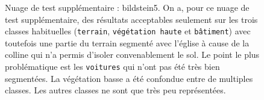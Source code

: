 \documentclass[a4paper, onecolumn, 11pt]{article}
\begin{document}
\begin{figure}[h]
    \qquad
    \caption{Nuage de test supplémentaire : bildstein5. On a, pour ce nuage de test supplémentaire, des résultats acceptables seulement sur les trois classes habituelles (\texttt{terrain}, \texttt{végétation haute} et \texttt{bâtiment}) avec toutefois une partie du terrain segmenté avec l'église à cause de la colline qui n'a permis d'isoler convenablement le sol. Le point le plus problématique est les \texttt{voitures} qui n'ont pas été très bien segmentées. La végétation basse a été confondue entre de multiples classes. Les autres classes ne sont que très peu représentées.}
    \label{fig:bildstein5}
\end{figure}
\end{document}

